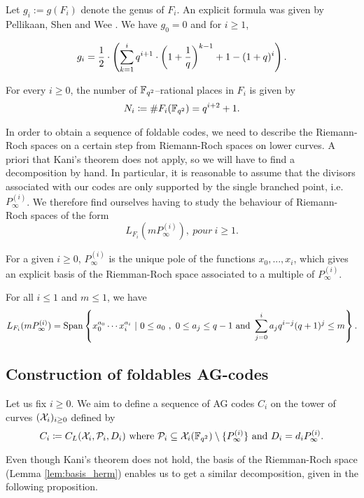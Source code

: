 \documentclass[10pt]{article}
\begin{document}
Let $g_i:=g(F_i)$ denote the genus of $F_i$. An explicit formula was given by Pellikaan, Shen and Wee \cite[Proposition 4]{PSW91}. We have $g_0=0$ and for $i\geq 1$, 

\begin{equation}\label{eq:genus_herm}
	g_i =\dfrac{1}{2} \cdot \left(\sum\limits_{k=1}^i q^{i+1} \cdot \left(1+\frac{1}{q}\right)^{k-1} +1 -(1+q)^i\right).
\end{equation}

For every $i \geq 0$, the number of $\mathbb{F}_{q^2}$--rational places in $F_i$ is given by
\[N_i \coloneqq \#F_i(\mathbb{F}_{q^2}) = q^{i+2}+1.\]

In order to obtain a sequence of foldable codes, we need to describe the Riemann-Roch spaces on a certain step from Riemann-Roch spaces on lower curves. A priori that Kani's theorem does not apply, so we will have to find a decomposition by hand. In particular, it is reasonable to assume that the divisors associated with our codes are only supported by the single branched point, i.e. $P^{(i)}_{\infty}$. We therefore find ourselves having to study the behaviour of Riemann-Roch spaces of the form 
\[L_{F_i}\left(mP^{(i)}_{\infty}\right), \ pour \ i \geq 1.\] 


For a given $i \geq 0$, $P^{(i)}_{\infty}$ is the unique pole of the functions $x_0,...,x_i$, which gives an explicit basis of the Riemman-Roch space associated to a multiple of $P^{(i)}_{\infty}$.

\begin{lemma}\label{lem:basis_herm}
For all $i \leq 1$ and $m \leq 1$, we have 
\[L_{F_i}(mP^{(i)}_{\infty}) = \operatorname{Span}\left\{x_0^{a_0} \cdots x_i^{a_i} \ | \ 0 \leq a_0 \ , \ 0 \leq a_j \leq q-1 \text{ and } \sum\limits_{j=0}^i a_jq^{i-j}(q+1)^j \leq m \right\}.\]
\end{lemma}

\subsection{Construction of foldables AG-codes}

Let us fix $i \geq 0$. We aim to define a sequence of AG codes $C_i$ on the tower of curves $(\mathcal{X}_i)_{i\geq 0}$ defined by 
\[C_i \coloneqq C_L(\mathcal{X}_i,\mathcal{P}_{i},D_i) \text{ where } \mathcal{P}_{i} \subseteq \mathcal{X}_i(\mathbb{F}_{q^2}) \setminus \{P_\infty^{(i)}\} \text{ and } D_i = d_iP^{(i)}_{\infty}.\]

Even though Kani's theorem does not hold, the basis of the Riemman-Roch space (Lemma \ref{lem:basis_herm}) enables us to get a similar decomposition, given in the following proposition.
\end{document}
